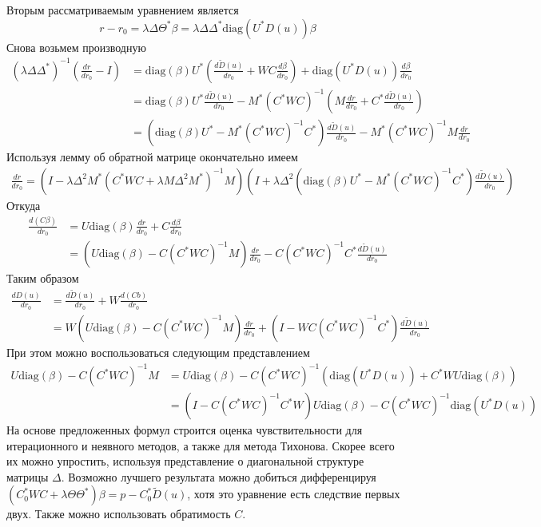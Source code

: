 \documentclass[10pt]{article}
\theoremstyle{definition}
\theoremstyle{remark}
\theoremstyle{plain}
\newcommand{\wt}{\widetilde}
\newcommand{\diag}{\mathrm{diag}}
\begin{document}
Вторым рассматриваемым уравнением является
$$
r - r_0= \lambda\Delta\Theta^*\beta = \lambda\Delta\Delta^*\diag(U^*D(u))\beta
$$
Снова возьмем производную
\begin{align*}
(\lambda\Delta\Delta^*)^{-1} \left(\frac{dr}{dr_0}-I\right) 
&= 
\diag(\beta)U^*\left(\frac{d\wt{D}(u)}{dr_0}+WC\frac{d\beta}{dr_0}\right)+
\diag(U^*D(u))\frac{d\beta}{dr_0} 
\\
&= 
\diag(\beta)U^*\frac{d\wt{D}(u)}{dr_0} -
M^*(C^*WC)^{-1}\left(M\frac{dr}{dr_0}+ C^*\frac{d\wt{D}(u)}{dr_0}\right)
\\
&=
\left(\diag(\beta)U^*-M^*(C^*WC)^{-1}C^*\right)\frac{d\wt{D}(u)}{dr_0}-
M^*(C^*WC)^{-1}M\frac{dr}{dr_0}
\end{align*}
Используя лемму об обратной матрице окончательно имеем
\begin{align*}
\frac{dr}{dr_0} = 
\left( I-\lambda\Delta^2 M^*(C^*WC+\lambda M\Delta^2M^*)^{-1}M\right)
\left( I + \lambda\Delta^2\left(\diag(\beta)U^*-M^*(C^*WC)^{-1}C^*\right)\frac{d\wt{D}(u)}{dr_0} \right)
\end{align*}
Откуда
\begin{align*}
\frac{d(C\beta)}{dr_0} &= U\diag(\beta)\frac{dr}{dr_0} +C\frac{d\beta}{dr_0}  \\
&= (U\diag(\beta) - C(C^*WC)^{-1}M)\frac{dr}{dr_0} - C(C^*WC)^{-1}C^*\frac{d\wt{D}(u)}{dr_0}
\end{align*}
Таким образом 
\begin{align*}
\frac{dD(u)}{dr_0} &= \frac{d\wt{D}(u)}{dr_0} + W\frac{d(Cb)}{dr_0}
\\
&= W(U\diag(\beta) - C(C^*WC)^{-1}M)\frac{dr}{dr_0} +(I- WC(C^*WC)^{-1}C^*)\frac{d\wt{D}(u)}{dr_0}
\end{align*}
При этом можно воспользоваться следующим представлением
\begin{align*}
U\diag(\beta) - C(C^*WC)^{-1}M &= U\diag(\beta) - C(C^*WC)^{-1}(\diag(U^*D(u))+C^*WU\diag(\beta))\\
&= (I - C(C^*WC)^{-1}C^*W)U\diag(\beta) - C(C^*WC)^{-1}\diag(U^*D(u))
\end{align*}
На основе предложенных формул строится оценка чувствительности для итерационного и неявного методов, а также для метода Тихонова. Скорее всего их можно упростить, используя представление о диагональной структуре матрицы $\Delta$. Возможно лучшего результата можно добиться дифференцируя $(C_0^*WC+\lambda\Theta\Theta^*)\beta = p - C_0^*\wt{D}(u)$, хотя это уравнение есть следствие первых двух. Также можно использовать обратимость $C$. 
\end{document}
